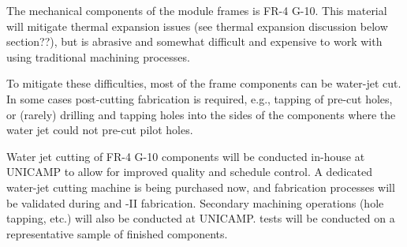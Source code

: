 The mechanical components of the  module frames is
FR-4 G-10. This material will mitigate thermal expansion issues (see thermal expansion discussion below section??), %
but is abrasive and somewhat difficult and expensive to work with using traditional machining processes.

To mitigate these difficulties, most of the  frame components can be water-jet cut. %
In some cases post-cutting fabrication is required, e.g., tapping of pre-cut holes, or (rarely) drilling and tapping holes into the sides of the components where the water jet could not pre-cut pilot holes.



Water jet cutting of FR-4 G-10 components will be conducted in-house at UNICAMP to allow for improved quality and schedule control.  A dedicated water-jet cutting machine is being purchased now, and fabrication processes will be validated during  and -II fabrication.  Secondary machining operations (hole tapping, etc.) will also be conducted at UNICAMP.   tests will be conducted on a representative sample of finished components.

\label{sec:fdsp-pd-prod-pc}



